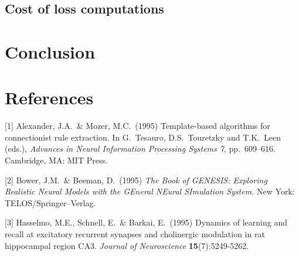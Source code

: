 \documentclass{article}
\begin{document}
  \subsection{Cost of loss computations}
  
  \section{Conclusion}
  
  
  \section*{References}
  
  \medskip
  
  \small
  
  [1] Alexander, J.A.\ \& Mozer, M.C.\ (1995) Template-based algorithms
  for connectionist rule extraction. In G.\ Tesauro, D.S.\ Touretzky and
  T.K.\ Leen (eds.), {\it Advances in Neural Information Processing
    Systems 7}, pp.\ 609--616. Cambridge, MA: MIT Press.
  
  [2] Bower, J.M.\ \& Beeman, D.\ (1995) {\it The Book of GENESIS:
    Exploring Realistic Neural Models with the GEneral NEural SImulation
    System.}  New York: TELOS/Springer--Verlag.
  
  [3] Hasselmo, M.E., Schnell, E.\ \& Barkai, E.\ (1995) Dynamics of
  learning and recall at excitatory recurrent synapses and cholinergic
  modulation in rat hippocampal region CA3. {\it Journal of
    Neuroscience} {\bf 15}(7):5249-5262.
  
  
\end{document}
